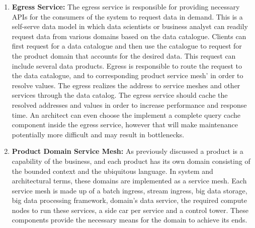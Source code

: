 \documentclass[review]{elsarticle}
\begin{document}
\begin{enumerate}
    \item \textbf{Egress Service:} The egress service is responsible for providing necessary APIs for the consumers of the system to request data in demand. This is a self-serve data model in which data scientists or business analyst can readily request data from various domains based on the data catalogue. Clients can first request for a data catalogue and then use the catalogue to request for the product domain that accounts for the desired data. This request can include several data products. Egress is responsible to route the request to the data catalogue, and to corresponding product service mesh' in order to resolve values. The egress realizes the address to service meshes and other services through the data catalog. The egress service should cache the resolved addresses and values in order to increase performance and response time. An architect can even choose the implement a complete query cache component inside the egress service, however that will make maintenance potentially more difficult and may result in bottlenecks.
    \item \textbf{Product Domain Service Mesh:} As previously discussed a product is a capability of the business, and each product has its own domain consisting of the bounded context and the ubiquitous language. In system and architectural terms, these domains are implemented as a service mesh. Each service mesh is made up of a batch ingress, stream ingress, big data storage, big data processing framework, domain's data service, the required compute nodes to run these services, a side car per service and a control tower. These components provide the necessary means for the domain to achieve its ends.

\end{enumerate}
\end{document}
